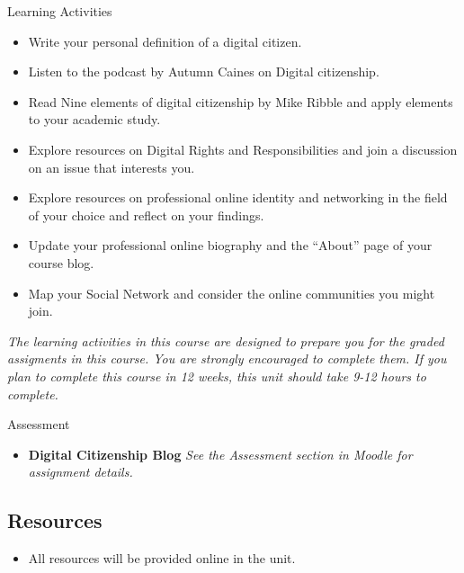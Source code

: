 \documentclass[
]{book}
\providecommand{\tightlist}{%
  \setlength{\itemsep}{0pt}\setlength{\parskip}{0pt}}
\theoremstyle{definition}
\theoremstyle{definition}
\theoremstyle{definition}
\theoremstyle{definition}
\theoremstyle{remark}
\begin{document}
\begin{reflect}
{Learning Activities}

\begin{itemize}
\tightlist
\item
  Write your personal definition of a digital citizen.
\item
  Listen to the podcast by Autumn Caines on Digital citizenship.
\item
  Read Nine elements of digital citizenship by Mike Ribble and apply elements to your academic study.
\item
  Explore resources on Digital Rights and Responsibilities and join a discussion on an issue that interests you.
\item
  Explore resources on professional online identity and networking in the field of your choice and reflect on your findings.
\item
  Update your professional online biography and the ``About'' page of your course blog.
\item
  Map your Social Network and consider the online communities you might join.
\end{itemize}

\emph{The learning activities in this course are designed to prepare you for the graded assigments in this course. You are strongly encouraged to complete them.
If you plan to complete this course in 12 weeks, this unit should take 9-12 hours to complete.}
\end{reflect}

\begin{assessment}
{Assessment}

\begin{itemize}
\tightlist
\item
  \textbf{Digital Citizenship Blog}
  \emph{See the Assessment section in Moodle for assignment details.}
\end{itemize}
\end{assessment}

\hypertarget{resources-4}{%
\subsection*{Resources}\label{resources-4}}

\begin{itemize}
\tightlist
\item
  All resources will be provided online in the unit.
\end{itemize}
\end{document}
